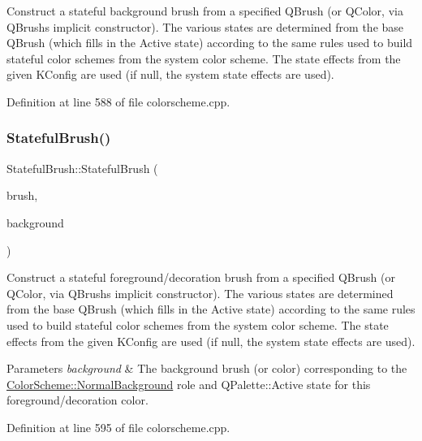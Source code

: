Construct a stateful background brush from a specified Q\+Brush (or Q\+Color, via Q\+Brush\textquotesingle{}s implicit constructor). The various states are determined from the base Q\+Brush (which fills in the Active state) according to the same rules used to build stateful color schemes from the system color scheme. The state effects from the given K\+Config are used (if null, the system state effects are used). 

Definition at line 588 of file colorscheme.\+cpp.

\mbox{\label{class_stateful_brush_a70251c65c2aef41bd81d07fa8b5dba60}} 
\subsubsection{\texorpdfstring{Stateful\+Brush()}{StatefulBrush()}\hspace{0.1cm}{\footnotesize\ttfamily [6/7]}}
{\footnotesize\ttfamily Stateful\+Brush\+::\+Stateful\+Brush (\begin{DoxyParamCaption}\item[{const Q\+Brush \&}]{brush,  }\item[{const Q\+Brush \&}]{background }\end{DoxyParamCaption})\hspace{0.3cm}{\ttfamily [explicit]}}

Construct a stateful foreground/decoration brush from a specified Q\+Brush (or Q\+Color, via Q\+Brush\textquotesingle{}s implicit constructor). The various states are determined from the base Q\+Brush (which fills in the Active state) according to the same rules used to build stateful color schemes from the system color scheme. The state effects from the given K\+Config are used (if null, the system state effects are used).


\begin{DoxyParams}{Parameters}
{\em background} & The background brush (or color) corresponding to the \hyperlink{class_color_scheme_a70715e73df1fb0f140797633f8043a8ca9762dd3095372ba69df3c550d96af844}{Color\+Scheme\+::\+Normal\+Background} role and Q\+Palette\+::\+Active state for this foreground/decoration color. \\
\hline
\end{DoxyParams}


Definition at line 595 of file colorscheme.\+cpp.

